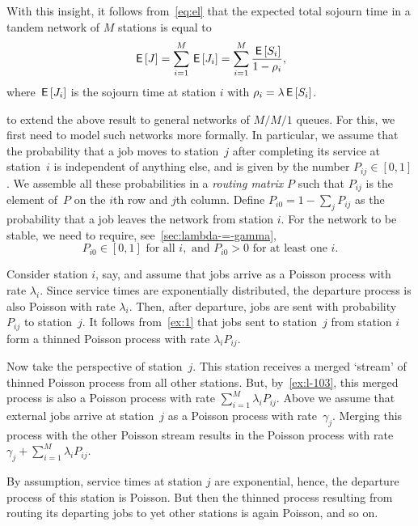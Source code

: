 With this insight, it follows from~\cref{eq:el} that the expected total sojourn time in a tandem network of $M$ stations is equal to
\begin{equation*}
  \,\mathsf{E}\left[J\right] = \sum_{i=1}^{M}\,\mathsf{E}\left[J_i\right] = \sum_{i=1}^M \frac{\,\mathsf{E}\left[S_i\right]}{1-\rho_i},
\end{equation*}
where $\,\mathsf{E}\left[J_i\right]$ is the sojourn time at station $i$ with $\rho_i = \lambda \,\mathsf{E}\left[S_i\right]$.



 to extend the above result to general networks of $M/M/1$ queues.
For this, we first need to model such networks more formally.
In particular, we assume that the probability that a job moves to station~$j$ after completing its service at station~$i$ is independent of anything else, and is given by the number $P_{i j}\in[0,1]$.
We assemble all these probabilities in a \emph{routing matrix} $P$ such that $P_{i j}$ is the element of~$P$ on the $i$th row and $j$th column.
Define $P_{i0} = 1-\sum_{j}P_{ij}$ as the probability that a job leaves the network from station $i$.
For the network to be stable, we need to require, see~\cref{sec:lambda-=-gamma},
\begin{equation}  \label{eq:34}
P_{i0}\in [0, 1] \text{ for all } i, \text{ and } P_{i0} > 0 \text{ for at least one } i.
\end{equation}

Consider station $i$, say, and assume that jobs arrive as a Poisson process with rate $\lambda_i$.
Since service times are exponentially distributed, the departure process is also Poisson with rate $\lambda_i$.
Then, after departure, jobs are sent with probability $P_{i j}$ to station~$j$.
It follows from~\cref{ex:1} that jobs sent to station~$j$ from station $i$ form a thinned Poisson process with rate $\lambda_i P_{i j}$.

Now take the perspective of station~$j$.
This station receives a merged `stream' of thinned Poisson process from all other stations.
But, by~\cref{ex:l-103}, this merged process is also a Poisson process with rate $\sum_{i=1}^{M}\lambda_i P_{ij}$.
Above we assume that external jobs arrive at station~$j$ as a Poisson process with rate~$\gamma_j$.
Merging this process with the other Poisson stream results in the Poisson process with rate $\gamma_j + \sum_{i=1}^M \lambda_i P_{i j}$.

By assumption, service times at station $j$ are exponential, hence, the departure process of this station is Poisson.
But then the thinned process resulting from routing its departing jobs to yet other stations is again Poisson, and so on.

